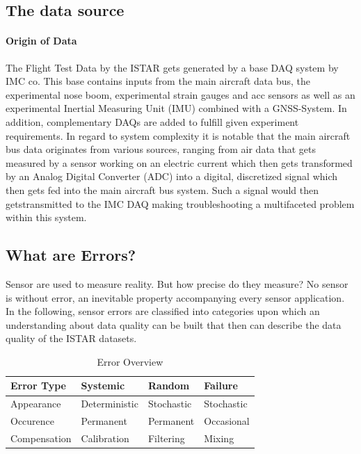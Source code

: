 \subsection{The data source}


\paragraph{Origin of Data}
The Flight Test Data by the ISTAR gets generated by a base DAQ system by IMC co. This base contains inputs from the main aircraft data bus, the experimental nose boom, experimental strain gauges and acc sensors as well as an experimental Inertial Measuring Unit (IMU) combined with a GNSS-System.
In addition, complementary DAQs are added to fulfill given experiment requirements.
In regard to system complexity it is notable that the main aircraft bus data originates from various sources, ranging from air data that gets measured by a sensor working on an electric current which then gets transformed by an Analog Digital Converter (ADC) into a digital, discretized signal which then gets fed into the main aircraft bus system. Such a signal would then getstransmitted to the IMC DAQ making troubleshooting a multifaceted problem within this system.




\subsection{What are Errors?}



Sensor are used to measure reality. But how precise do they measure? No sensor is without error, an inevitable property accompanying every sensor application. In the following, sensor errors are classified into categories upon which an understanding about data quality can be built that then can describe the data quality of the ISTAR datasets.
\begin{table}[h]
    \centering
    \begin{tabular}{@{}llll@{}}
        \toprule
        Error Type   & Systemic      & Random     & Failure    \\ \midrule
        Appearance   & Deterministic & Stochastic & Stochastic \\
        Occurence    & Permanent     & Permanent  & Occasional \\
        Compensation & Calibration   & Filtering  & Mixing     \\ \bottomrule
    \end{tabular}
    \caption{Error Overview \cite{hartmann_navigation-sensordatenfusion_2022}}
    \label{tab:error_types}
\end{table}


